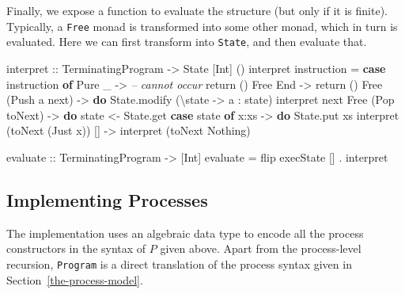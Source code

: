 \documentclass[runningheads,plain]{llncs}
\newenvironment{Shaded}{}{}
\newcommand{\KeywordTok}[1]{\textcolor[rgb]{0.00,0.44,0.13}{\textbf{#1}}}
\newcommand{\DataTypeTok}[1]{\textcolor[rgb]{0.56,0.13,0.00}{#1}}
\newcommand{\CommentTok}[1]{\textcolor[rgb]{0.38,0.63,0.69}{\textit{#1}}}
\newcommand{\OtherTok}[1]{\textcolor[rgb]{0.00,0.44,0.13}{#1}}
\newcommand{\FunctionTok}[1]{\textcolor[rgb]{0.02,0.16,0.49}{#1}}
\newcommand{\NormalTok}[1]{#1}
\begin{document}
Finally, we expose a function to evaluate the structure (but
only if it is finite). Typically, a \texttt{Free} monad is transformed
into some other monad, which in turn is evaluated. Here we can first transform into \texttt{State}, and then evaluate that.

\begin{Shaded}
\begin{Highlighting}[]
\OtherTok{interpret ::} \DataTypeTok{TerminatingProgram} \OtherTok{->} \DataTypeTok{State}\NormalTok{ [}\DataTypeTok{Int}\NormalTok{] () }
\NormalTok{interpret instruction }\FunctionTok{=} 
    \KeywordTok{case}\NormalTok{ instruction }\KeywordTok{of}
        \DataTypeTok{Pure}\NormalTok{ _ }\OtherTok{->} 
            \CommentTok{-- cannot occur}
\NormalTok{            return () }
        \DataTypeTok{Free} \DataTypeTok{End} \OtherTok{->} 
\NormalTok{            return () }
        \DataTypeTok{Free}\NormalTok{ (}\DataTypeTok{Push}\NormalTok{ a next) }\OtherTok{->} \KeywordTok{do} 
\NormalTok{            State.modify (\textbackslash{}state }\OtherTok{->}\NormalTok{ a }\FunctionTok{:}\NormalTok{ state)}
\NormalTok{            interpret next}
        \DataTypeTok{Free}\NormalTok{ (}\DataTypeTok{Pop}\NormalTok{ toNext) }\OtherTok{->} \KeywordTok{do}
\NormalTok{            state }\OtherTok{<-}\NormalTok{ State.get}
            \KeywordTok{case}\NormalTok{ state }\KeywordTok{of} 
\NormalTok{                x}\FunctionTok{:}\NormalTok{xs }\OtherTok{->} \KeywordTok{do}
\NormalTok{                    State.put xs}
\NormalTok{                    interpret (toNext (}\DataTypeTok{Just}\NormalTok{ x))}
\NormalTok{                [] }\OtherTok{->} 
\NormalTok{                    interpret (toNext }\DataTypeTok{Nothing}\NormalTok{)}

\OtherTok{evaluate ::} \DataTypeTok{TerminatingProgram} \OtherTok{->}\NormalTok{ [}\DataTypeTok{Int}\NormalTok{] }
\NormalTok{evaluate }\FunctionTok{=}\NormalTok{ flip execState [] }\FunctionTok{.}\NormalTok{ interpret }
\end{Highlighting}
\end{Shaded}


\subsection{Implementing Processes}
The implementation uses an algebraic data type %
to encode all the process constructors in the syntax of $P$ given above. 
Apart from the process-level recursion, \texttt{Program} is a direct translation of the process syntax given in Section~\ref{the-process-model}.
\end{document}
